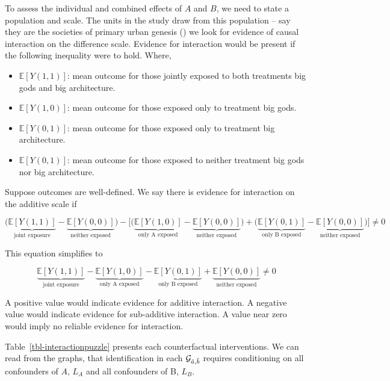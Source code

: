 \documentclass[
  single column]{article}
\providecommand{\tightlist}{%
  \setlength{\itemsep}{0pt}\setlength{\parskip}{0pt}}\usepackage{longtable,booktabs,array}
\begin{document}
To assess the individual and combined effects of \(A\) and \(B\), we
need to state a population and scale. The units in the study draw from
this population -- say they are the societies of primary urban genesis
() we look for evidence
of causal interaction on the difference scale. Evidence for interaction
would be present if the following inequality were to hold. Where,

\begin{itemize}
\tightlist
\item
  \(\mathbb{E}[Y(1,1)]\): mean outcome for those jointly exposed to both
  treatments big gods and big architecture.
\item
  \(\mathbb{E}[Y(1,0)]\): mean outcome for those exposed only to
  treatment big gods.
\item
  \(\mathbb{E}[Y(0,1)]\): mean outcome for those exposed only to
  treatment big architecture.
\item
  \(\mathbb{E}[Y(0,1)]\): mean outcome for those exposed to neither
  treatment big gods nor big architecture.
\end{itemize}

Suppose outcomes are well-defined. We say there is evidence for
interaction on the additive scale if

\[
\bigg(\underbrace{\mathbb{E}[Y(1,1)]}_{\text{joint exposure}} - \underbrace{\mathbb{E}[Y(0,0)]}_{\text{neither exposed}}\bigg) - \bigg[ \bigg(\underbrace{\mathbb{E}[Y(1,0)]}_{\text{only A exposed}} - \underbrace{\mathbb{E}[Y(0,0)]}_{\text{neither exposed}}\bigg) + \bigg(\underbrace{\mathbb{E}[Y(0,1)]}_{\text{only B exposed}} - \underbrace{\mathbb{E}[Y(0,0)]}_{\text{neither exposed}} \bigg)\bigg] \neq 0 
\]

This equation simplifies to

\[ 
\underbrace{\mathbb{E}[Y(1,1)]}_{\text{joint exposure}} - \underbrace{\mathbb{E}[Y(1,0)]}_{\text{only A exposed}} - \underbrace{\mathbb{E}[Y(0,1)]}_{\text{only B exposed}} + \underbrace{\mathbb{E}[Y(0,0)]}_{\text{neither exposed}} \neq 0 
\]

A positive value would indicate evidence for additive interaction. A
negative value would indicate evidence for sub-additive interaction. A
value near zero would imply no reliable evidence for interaction.

Table~\ref{tbl-interactionpuzzle} presents each counterfactual
interventions. We can read from the graphs, that identification in each
\(\mathcal{G}_{\Tilde{a}, \Tilde{b}}\) requires conditioning on all
confounders of \(A\), \(L_A\) and all confounders of B, \(L_B\).
\end{document}

